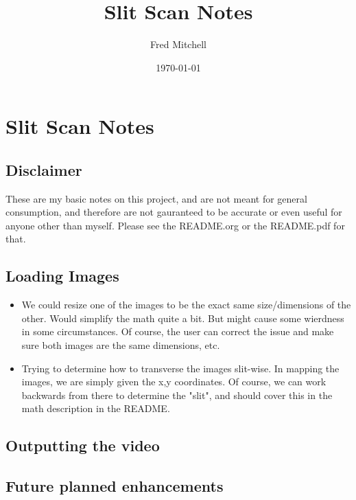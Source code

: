 \documentclass[letterpaper, 11pt]{article}
\author{Fred Mitchell}
\date{\today}
\title{Slit Scan Notes}
\begin{document}
\maketitle
\tableofcontents


\section{Slit Scan Notes}
\label{sec:org3a63403}
\subsection{Disclaimer}
\label{sec:orge4d2be4}
These are my basic notes on this project, and are not
meant for general consumption, and therefore are not
gauranteed to be accurate or even useful for anyone 
other than myself. Please see the README.org or the
README.pdf for that.
\subsection{Loading Images}
\label{sec:org83330a2}
\begin{itemize}
\item We could resize one of the images to be the 
exact same size/dimensions of the other. Would simplify 
the math quite a bit. But might cause some wierdness
in some circumstances. Of course, the user
can correct the issue and make sure both images
are the same dimensions, etc.
\item Trying to determine how to transverse the images 
slit-wise. In mapping the images, we are simply
given the x,y coordinates. Of course, we can
work backwards from there to determine the "slit",
and should cover this in the math description in the README.
\end{itemize}


\subsection{Outputting the video}
\label{sec:orgdd0bc43}
\subsection{Future planned enhancements}
\label{sec:orgcbba795}
\end{document}
